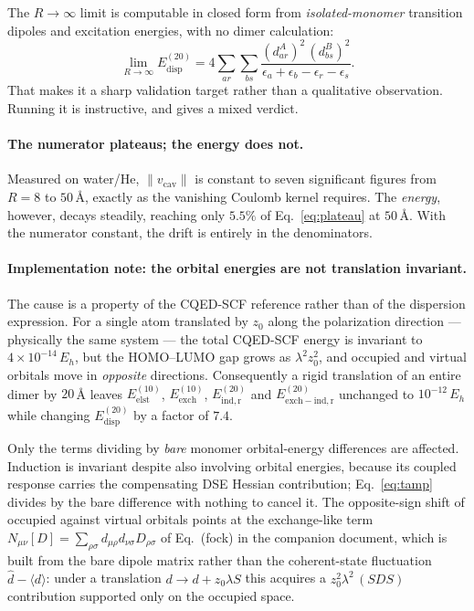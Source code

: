 \documentclass[11pt]{article}
\newcommand{\dop}{\hat{d}}                      %
\newcommand{\dexp}{\langle d \rangle}
\begin{document}
The $R\to\infty$ limit is computable in closed form from \emph{isolated-monomer}
transition dipoles and excitation energies, with no dimer calculation:
\begin{equation}
\lim_{R\to\infty} E^{(20)}_{\mathrm{disp}}
= 4 \sum_{ar}\sum_{bs}
\frac{(d^{A}_{ar})^{2}\,(d^{B}_{bs})^{2}}
     {\epsilon_a + \epsilon_b - \epsilon_r - \epsilon_s} .
\label{eq:plateau}
\end{equation}
That makes it a sharp validation target rather than a qualitative observation.
Running it is instructive, and gives a mixed verdict.

\paragraph{The numerator plateaus; the energy does not.} Measured on water/He,
$\lVert v_{\mathrm{cav}}\rVert$ is constant to seven significant figures from
$R = 8$ to $50$\,\AA{}, exactly as the vanishing Coulomb kernel requires. The
\emph{energy}, however, decays steadily, reaching only $5.5\%$ of
Eq.~\eqref{eq:plateau} at $50$\,\AA. With the numerator constant, the drift is
entirely in the denominators.

\paragraph{Implementation note: the orbital energies are not translation
invariant.} The cause is a property of the CQED-SCF reference rather than of
the dispersion expression. For a single atom translated by $z_0$ along the
polarization direction --- physically the same system --- the total CQED-SCF
energy is invariant to $4\times10^{-14}\,E_h$, but the HOMO--LUMO gap grows as
$\lambda^2 z_0^2$, and occupied and virtual orbitals move in \emph{opposite}
directions. Consequently a rigid translation of an entire dimer by $20$\,\AA{}
leaves $E^{(10)}_{\mathrm{elst}}$, $E^{(10)}_{\mathrm{exch}}$,
$E^{(20)}_{\mathrm{ind,r}}$ and $E^{(20)}_{\mathrm{exch-ind,r}}$ unchanged to
$10^{-12}\,E_h$ while changing $E^{(20)}_{\mathrm{disp}}$ by a factor of $7.4$.

Only the terms dividing by \emph{bare} monomer orbital-energy differences are
affected. Induction is invariant despite also involving orbital energies,
because its coupled response carries the compensating DSE Hessian contribution;
Eq.~\eqref{eq:tamp} divides by the bare difference with nothing to cancel it.
The opposite-sign shift of occupied against virtual orbitals points at the
exchange-like term $N_{\mu\nu}[D] = \sum_{\rho\sigma} d_{\mu\rho} d_{\nu\sigma}
D_{\rho\sigma}$ of Eq.~(fock) in the companion document, which is built from
the bare dipole matrix rather than the coherent-state fluctuation
$\dop - \dexp$: under a translation $d \to d + z_0\lambda S$ this acquires a
$z_0^2\lambda^2\,(SDS)$ contribution supported only on the occupied space.
\end{document}
